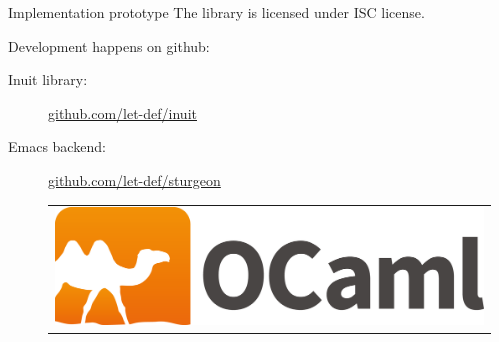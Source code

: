 \documentclass[final]{beamer}
\newlength{\sepwid}
\newlength{\onecolwid}
\begin{document}
\begin{frame}[containsverbatim,t]
\begin{columns}[t]
\begin{column}{\onecolwid}
\begin{alertblock}{Implementation prototype}
The library is licensed under ISC license.

Development happens on github:
\begin{description}
  \item[Inuit library:]
    \href{https://github.com/let-def/inuit}{github.com/let-def/inuit}
  \item[Emacs backend:]
    \href{https://github.com/let-def/sturgeon}{github.com/let-def/sturgeon}

\begin{center}
\begin{tabular}{c}
\includegraphics[width=0.4\linewidth]{logo.png}
\end{tabular}
\end{center}

\end{description}

\end{alertblock}

\end{column} %

\begin{column}{\sepwid}\end{column} %

\end{columns}

\end{frame} %
\end{document}
